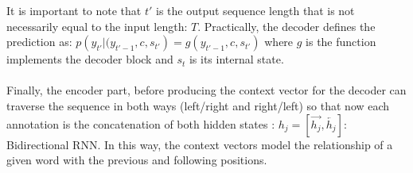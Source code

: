 \documentclass[LaM,binding=0.6cm]{sapthesis}
\begin{document}
It is important to note that $t'$ is the output sequence length that is not necessarily equal to the input length: $T$. Practically, the decoder defines the prediction as: $p\left(y_{t'}|(y_{t'-1},c,s_{t'}\right)=g\left(y_{t'-1},c,s_{t'}\right)$ where $g$ is the function implements the decoder block and $s_t$ is its internal state.\\\\Finally, the encoder part, before producing the context vector for the decoder can traverse the sequence in both ways (left/right and right/left) so that now each annotation is the concatenation of both hidden states : $h_j = \left[\overrightarrow{h_j},\overleftarrow{h_j}\right]$: Bidirectional RNN. In this way, the context vectors model the relationship of a given word with the previous and following positions.
\end{document}
